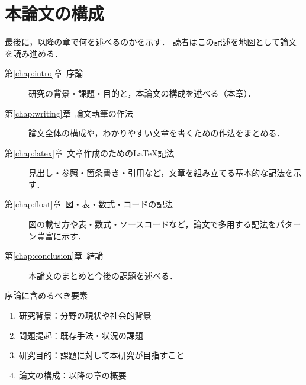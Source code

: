\section{本論文の構成}
\label{sec:structure}
最後に，以降の章で何を述べるのかを示す．
読者はこの記述を地図として論文を読み進める．

\begin{description}
    \item[第\ref{chap:intro}章\ 序論] 研究の背景・課題・目的と，本論文の構成を述べる（本章）．
    \item[第\ref{chap:writing}章\ 論文執筆の作法] 論文全体の構成や，わかりやすい文章を書くための作法をまとめる．
    \item[第\ref{chap:latex}章\ 文章作成のための\LaTeX 記法] 見出し・参照・箇条書き・引用など，文章を組み立てる基本的な記法を示す．
    \item[第\ref{chap:float}章\ 図・表・数式・コードの記法] 図の載せ方や表・数式・ソースコードなど，論文で多用する記法をパターン豊富に示す．
    \item[第\ref{chap:conclusion}章\ 結論] 本論文のまとめと今後の課題を述べる．
\end{description}

\begin{itembox}[l]{序論に含めるべき要素}
    \begin{enumerate}
        \item 研究背景：分野の現状や社会的背景
        \item 問題提起：既存手法・状況の課題
        \item 研究目的：課題に対して本研究が目指すこと
        \item 論文の構成：以降の章の概要
    \end{enumerate}
\end{itembox}
